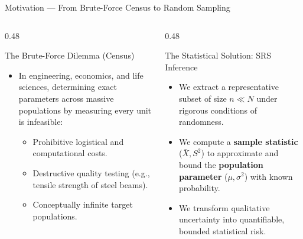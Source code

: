 \documentclass[10pt, aspectratio=169]{beamer}
\begin{document}
\begin{frame}{Motivation --- From Brute-Force Census to Random Sampling}
  \begin{columns}[T]
    \begin{column}{0.48\textwidth}
      \begin{block}{The Brute-Force Dilemma (Census)}
        \small
        \begin{itemize}\itemsep=0.1cm
          \item In engineering, economics, and life sciences, determining exact parameters across massive populations by measuring every unit is infeasible:
          \begin{itemize}
            \item Prohibitive logistical and computational costs.
            \item Destructive quality testing (e.g., tensile strength of steel beams).
            \item Conceptually infinite target populations.
          \end{itemize}
        \end{itemize}
      \end{block}
    \end{column}
    \begin{column}{0.48\textwidth}
      \begin{alertblock}{The Statistical Solution: SRS Inference}
        \small
        \begin{itemize}\itemsep=0.1cm
          \item We extract a representative subset of size $n \ll N$ under rigorous conditions of randomness.
          \item We compute a \textbf{sample statistic} ($\bar{X}, S^2$) to approximate and bound the \textbf{population parameter} ($\mu, \sigma^2$) with known probability.
          \item We transform qualitative uncertainty into quantifiable, bounded statistical risk.
        \end{itemize}
      \end{alertblock}
    \end{column}
  \end{columns}
\end{frame}
\end{document}
